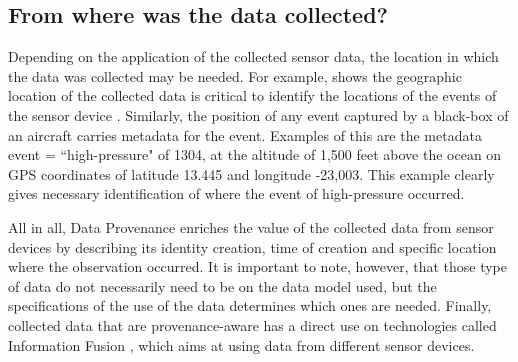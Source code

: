 \subsection{From where was the data collected?}

Depending on the application of the collected sensor data, the location in
which the data was collected may be needed. For example, \cite{sn-geo-metadata}
shows the geographic location of the collected data is critical to identify
the locations of the events of the sensor device \cite{sn-ex02}. Similarly,
the position of any event captured by a black-box of an aircraft carries 
metadata for the event. Examples of this are the metadata event =
``high-pressure" of 1304, at the altitude of 1,500 feet above the ocean on GPS
coordinates of latitude 13.445 and longitude -23,003. This example clearly
gives necessary identification of where the event of high-pressure occurred.

All in all, Data Provenance enriches the value of the collected data from
sensor devices by describing its identity creation, time of creation and
specific location where the observation occurred. It is important to note,
however, that those type of data do not necessarily need to be on the data
model used, but the specifications of the use of the data determines which
ones are needed. Finally, collected data that are provenance-aware has a direct
use on technologies called Information Fusion \cite{sn-info-fusion}, which aims
at using data from different sensor devices.
